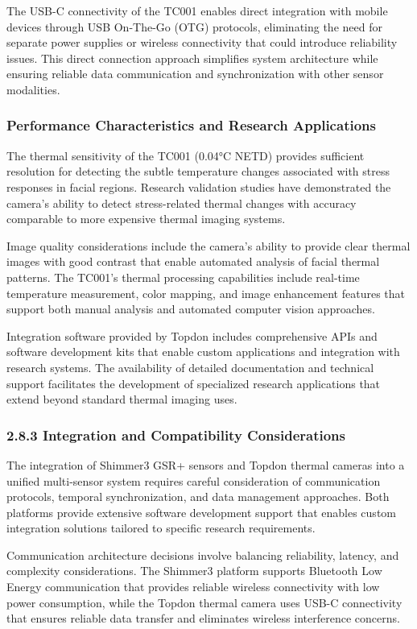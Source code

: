 \documentclass[11pt,a4paper]{article}
\begin{document}
The USB-C connectivity of the TC001 enables direct integration with mobile devices through USB On-The-Go (OTG)
protocols, eliminating the need for separate power supplies or wireless connectivity that could introduce reliability
issues. This direct connection approach simplifies system architecture while ensuring reliable data communication and
synchronization with other sensor modalities.

\subsubsection{Performance Characteristics and Research Applications}

The thermal sensitivity of the TC001 (0.04°C NETD) provides sufficient resolution for detecting the subtle temperature
changes associated with stress responses in facial regions. Research validation studies have demonstrated the camera's
ability to detect stress-related thermal changes with accuracy comparable to more expensive thermal imaging systems.

Image quality considerations include the camera's ability to provide clear thermal images with good contrast that enable
automated analysis of facial thermal patterns. The TC001's thermal processing capabilities include real-time temperature
measurement, color mapping, and image enhancement features that support both manual analysis and automated computer
vision approaches.

Integration software provided by Topdon includes comprehensive APIs and software development kits that enable custom
applications and integration with research systems. The availability of detailed documentation and technical support
facilitates the development of specialized research applications that extend beyond standard thermal imaging uses.

\subsubsection{2.8.3 Integration and Compatibility Considerations}

The integration of Shimmer3 GSR+ sensors and Topdon thermal cameras into a unified multi-sensor system requires careful
consideration of communication protocols, temporal synchronization, and data management approaches. Both platforms
provide extensive software development support that enables custom integration solutions tailored to specific research
requirements.

Communication architecture decisions involve balancing reliability, latency, and complexity considerations. The Shimmer3
platform supports Bluetooth Low Energy communication that provides reliable wireless connectivity with low power
consumption, while the Topdon thermal camera uses USB-C connectivity that ensures reliable data transfer and eliminates
wireless interference concerns.
\end{document}
